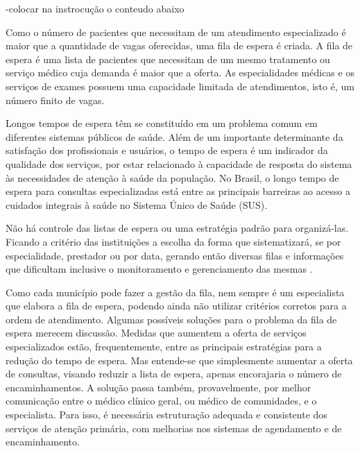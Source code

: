     -colocar na instrocução o conteudo abaixo
    
    Como o número de pacientes que necessitam de um atendimento especializado é maior que a quantidade de vagas oferecidas, uma fila de espera é criada. A fila de espera é uma lista de pacientes que necessitam de um mesmo tratamento ou serviço médico cuja demanda é maior que a oferta. As
    especialidades médicas e os serviços de exames possuem uma capacidade limitada de atendimentos, isto é, um número finito de vagas.
    
    Longos tempos de espera têm se constituído em um problema comum em diferentes sistemas públicos de saúde. Além de um importante determinante da satisfação dos profissionais e usuários, o tempo de espera é um indicador da qualidade dos serviços, por estar relacionado à capacidade de resposta do sistema às necessidades de atenção à saúde da população.  No Brasil, o longo tempo de espera para consultas especializadas está entre as principais barreiras ao acesso a cuidados integrais à saúde no Sistema Único de Saúde (SUS).
    
    Não há controle das listas de espera ou uma estratégia padrão para organizá-las. Ficando a critério das instituições a escolha da forma que sistematizará, se por especialidade, prestador ou por data, gerando então diversas filas e informações que dificultam inclusive o monitoramento e gerenciamento das mesmas .
    
    Como cada município pode fazer a gestão da fila, nem sempre é um especialista que elabora a fila de espera, podendo ainda não utilizar critérios corretos para a ordem de atendimento. Algumas possíveis soluções para o problema da fila de espera merecem discussão. Medidas que aumentem a oferta de serviços especializados estão, frequentemente, entre as principais estratégias para a redução do tempo de espera. Mas entende-se que simplesmente aumentar a oferta de consultas, visando reduzir a lista de espera, apenas encorajaria o número de encaminhamentos. A solução passa também, provavelmente, por melhor comunicação entre o médico clínico geral, ou médico de comunidades, e o especialista. Para isso, é necessária estruturação adequada e consistente dos serviços de atenção primária, com melhorias nos sistemas de agendamento e de encaminhamento.
    
  